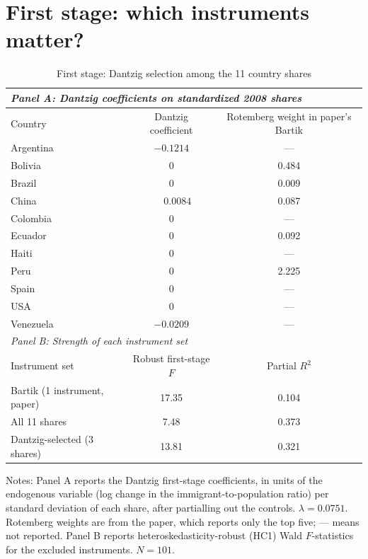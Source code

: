 \documentclass[11pt]{article}
\begin{document}
\section{First stage: which instruments matter?}

\begin{table}[htbp]
\centering
\small
\begin{threeparttable}
\caption{First stage: Dantzig selection among the 11 country shares}
\label{tab:first}
\begin{tabular}{lcc}
\toprule
\multicolumn{3}{l}{\emph{Panel A: Dantzig coefficients on standardized 2008 shares}}\\
\midrule
Country & Dantzig coefficient & Rotemberg weight in paper's Bartik \\
\midrule
Argentina & $-0.1214$ & --- \\
Bolivia   & 0         & 0.484 \\
Brazil    & 0         & 0.009 \\
China     & $\phantom{-}0.0084$ & 0.087 \\
Colombia  & 0         & --- \\
Ecuador   & 0         & 0.092 \\
Haiti     & 0         & --- \\
Peru      & 0         & 2.225 \\
Spain     & 0         & --- \\
USA       & 0         & --- \\
Venezuela & $-0.0209$ & --- \\
\midrule
\multicolumn{3}{l}{\emph{Panel B: Strength of each instrument set}}\\
\midrule
Instrument set & Robust first-stage $F$ & Partial $R^2$ \\
\midrule
Bartik (1 instrument, paper)        & 17.35 & 0.104 \\
All 11 shares                        & \phantom{1}7.48 & 0.373 \\
Dantzig-selected (3 shares)          & 13.81 & 0.321 \\
\bottomrule
\end{tabular}
\begin{tablenotes}[flushleft]
\footnotesize
\item Notes: Panel A reports the Dantzig first-stage coefficients, in units of the
endogenous variable (log change in the immigrant-to-population ratio) per standard
deviation of each share, after partialling out the controls. $\lambda = 0.0751$. Rotemberg
weights are from the paper, which reports only the top five; --- means not reported. Panel
B reports heteroskedasticity-robust (HC1) Wald $F$-statistics for the excluded
instruments. $N = 101$.
\end{tablenotes}
\end{threeparttable}
\end{table}
\end{document}
